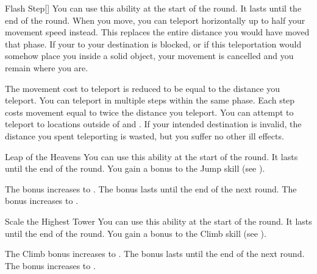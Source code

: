 {            \begin{apability}{Flash Step}[]
                You can use this ability at the start of the round.
                It lasts until the end of the round.
                When you move, you can teleport horizontally up to half your movement speed instead.
                This replaces the entire distance you would have moved that phase.
                If your  to your destination is blocked, or if this teleportation would somehow place you inside a solid object, your movement is cancelled and you remain where you are.

                \rankline
                 The movement cost to teleport is reduced to be equal to the distance you teleport.
                 You can teleport in multiple steps within the same phase.
                Each step costs movement equal to twice the distance you teleport.
                 You can attempt to teleport to locations outside of  and .
                If your intended destination is invalid, the distance you spent teleporting is wasted, but you suffer no other ill effects.
            \end{apability}

            \begin{apability}{Leap of the Heavens}
                You can use this ability at the start of the round.
                It lasts until the end of the round.
                You gain a  bonus to the Jump skill (see ).

                \rankline
                 The bonus increases to .
                 The bonus lasts until the end of the next round.
                 The bonus increases to .
            \end{apability}

            \begin{apability}{Scale the Highest Tower}
                You can use this ability at the start of the round.
                It lasts until the end of the round.
                You gain a  bonus to the Climb skill (see ).

                \rankline
                 The Climb bonus increases to .
                 The bonus lasts until the end of the next round.
                 The bonus increases to .
            \end{apability}

}
